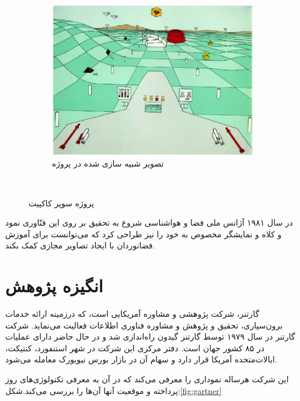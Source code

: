 \begin{figure}
\begin{subfigure}[b]{0.5\textwidth}
		\includegraphics[width=\textwidth]{image/airforce2}
		\caption{تصویر شبیه سازی شده در پروژه}
		\label{fig:tiger}
	\end{subfigure}
	~ %
	
	\caption{پروژه سوپر کاکپیت \cite{Furness2}}\label{fig:Super-Cockpit}
\end{figure}


در سال ۱۹۸۱ آژانس ملی فضا و هواشناسی  شروع به تحقیق بر روی این فنّاوری نمود و کلاه و نمایشگر مخصوص به خود را نیز طراحی کرد که می‌توانست برای آموزش فضانوردان با ایجاد تصاویر مجازی کمک بکند\cite{Furness2}.

\section{انگیزه پژوهش}
\noindent
گارتنر، شرکت پژوهشی و مشاوره آمریکایی است، که درزمینه ارائه خدمات برون‌سپاری، تحقیق و پژوهش و مشاوره فناوری اطلاعات فعالیت می‌نماید. شرکت گارتنر در سال ۱۹۷۹ توسط گارتنر گیدون  راه‌اندازی شد و در حال حاضر دارای عملیات در ۸۵ کشور جهان است. دفتر مرکزی این شرکت در شهر استنفورد، کنتیکت، ایالات‌متحده آمریکا قرار دارد و سهام آن در بازار بورس نیویورک معامله می‌شود.

این شرکت هرساله نموداری را معرفی می‌کند که در آن به معرفی تکنولوژی‌های روز پرداخته و موقعیت آنها آن‌ها را بررسی می‌کند.شکل:\ref{fig:gartner}
\\

